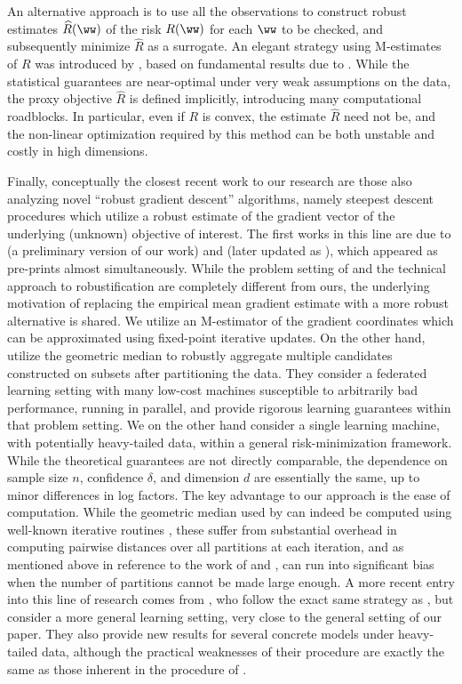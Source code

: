 \documentclass[11pt,oneside]{article}
\theoremstyle{definition} \newtheorem{defn}{Definition}       %
\theoremstyle{plain} \newtheorem{prop}[defn]{Proposition}           %
\theoremstyle{plain} \newtheorem{thm}[defn]{Theorem}                %
\theoremstyle{plain} \newtheorem{lem}[defn]{Lemma}                  %
\theoremstyle{plain} \newtheorem{cor}[defn]{Corollary}              %
\theoremstyle{remark} \newtheorem{rmk}[defn]{Remark}                %
\theoremstyle{remark} \newtheorem{ex}[defn]{Example}                %
\begin{document}
An alternative approach is to use all the observations to construct robust estimates $\widehat{R}(\ww)$ of the risk $R(\ww)$ for each $\ww$ to be checked, and subsequently minimize $\widehat{R}$ as a surrogate. An elegant strategy using M-estimates of $R$ was introduced by \citet{brownlees2015a}, based on fundamental results due to \citet{catoni2009a,catoni2012a}. While the statistical guarantees are near-optimal under very weak assumptions on the data, the proxy objective $\widehat{R}$ is defined implicitly, introducing many computational roadblocks. In particular, even if $R$ is convex, the estimate $\widehat{R}$ need not be, and the non-linear optimization required by this method can be both unstable and costly in high dimensions.

Finally, conceptually the closest recent work to our research are those also analyzing novel ``robust gradient descent'' algorithms, namely steepest descent procedures which utilize a robust estimate of the gradient vector of the underlying (unknown) objective of interest. The first works in this line are due to \citet{holland2017a} (a preliminary version of our work) and \citet{chen2017a} (later updated as \citet{chen2017b}), which appeared as pre-prints almost simultaneously. While the problem setting of \citet{chen2017b} and the technical approach to robustification are completely different from ours, the underlying motivation of replacing the empirical mean gradient estimate with a more robust alternative is shared. We utilize an M-estimator of the gradient coordinates which can be approximated using fixed-point iterative updates. On the other hand, \citet{chen2017a} utilize the geometric median to robustly aggregate multiple candidates constructed on subsets after partitioning the data. They consider a federated learning setting with many low-cost machines susceptible to arbitrarily bad performance, running in parallel, and provide rigorous learning guarantees within that problem setting. We on the other hand consider a single learning machine, with potentially heavy-tailed data, within a general risk-minimization framework. While the theoretical guarantees are not directly comparable, the dependence on sample size $n$, confidence $\delta$, and dimension $d$ are essentially the same, up to minor differences in log factors. The key advantage to our approach is the ease of computation. While the geometric median used by \citet{chen2017b} can indeed be computed using well-known iterative routines \citep{vardi2000a}, these suffer from substantial overhead in computing pairwise distances over all partitions at each iteration, and as mentioned above in reference to the work of \citet{minsker2015a} and \citet{hsu2016a}, can run into significant bias when the number of partitions cannot be made large enough. A more recent entry into this line of research comes from \citet{prasad2018a}, who follow the exact same strategy as \citet{chen2017b}, but consider a more general learning setting, very close to the general setting of our paper. They also provide new results for several concrete models under heavy-tailed data, although the practical weaknesses of their procedure are exactly the same as those inherent in the procedure of \citet{chen2017b}.
\end{document}
